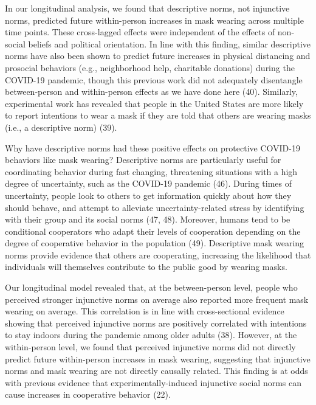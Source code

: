 \documentclass[
  man, donotrepeattitle,floatsintext]{apa6}
\begin{document}
In our longitudinal analysis, we found that descriptive norms, not injunctive norms, predicted future within-person increases in mask wearing across multiple time points. These cross-lagged effects were independent of the effects of non-social beliefs and political orientation. In line with this finding, similar descriptive norms have also been shown to predict future increases in physical distancing and prosocial behaviors (e.g., neighborhood help, charitable donations) during the COVID-19 pandemic, though this previous work did not adequately disentangle between-person and within-person effects as we have done here (40). Similarly, experimental work has revealed that people in the United States are more likely to report intentions to wear a mask if they are told that others are wearing masks (i.e., a descriptive norm) (39).

Why have descriptive norms had these positive effects on protective COVID-19 behaviors like mask wearing? Descriptive norms are particularly useful for coordinating behavior during fast changing, threatening situations with a high degree of uncertainty, such as the COVID-19 pandemic (46). During times of uncertainty, people look to others to get information quickly about how they should behave, and attempt to alleviate uncertainty-related stress by identifying with their group and its social norms (47, 48). Moreover, humans tend to be conditional cooperators who adapt their levels of cooperation depending on the degree of cooperative behavior in the population (49). Descriptive mask wearing norms provide evidence that others are cooperating, increasing the likelihood that individuals will themselves contribute to the public good by wearing masks.

Our longitudinal model revealed that, at the between-person level, people who perceived stronger injunctive norms on average also reported more frequent mask wearing on average. This correlation is in line with cross-sectional evidence showing that perceived injunctive norms are positively correlated with intentions to stay indoors during the pandemic among older adults (38). However, at the within-person level, we found that perceived injunctive norms did not directly predict future within-person increases in mask wearing, suggesting that injunctive norms and mask wearing are not directly causally related. This finding is at odds with previous evidence that experimentally-induced injunctive social norms can cause increases in cooperative behavior (22).
\end{document}
